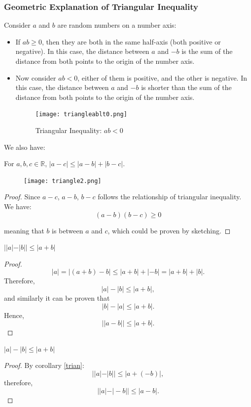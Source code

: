 \documentclass[
	12pt, %
	fleqn, %
	a4paper, %
]{LegrandOrangeBook}
\begin{document}
\subsubsection*{Geometric Explanation of Triangular Inequality}
    Consider $a$ and $b$ are random numbers on a number axis:
    \begin{itemize}
        \item If $ab \geq 0$, then they are both in the same half-axis (both positive or negative). In this case, the distance between $a$ and $-b$
        is the sum of the distance from both points to the origin of the number axis.
        \item  Now consider $ab < 0$, either of them is positive, and the other is negative. In this case, the distance between $a$ and $-b$ is shorter than the sum of 
        the distance from both points to the origin of the number axis.
        \begin{figure}[H]
            \centering
            \texttt{[image: triangleablt0.png]}
            \caption{Triangular Inequality: $ab < 0$}
        \end{figure}
    \end{itemize}

We also have:
    \begin{theorem}
        For $a, b, c\in \mathbb{R}$, $|a-c|\leq |a-b| + |b-c|$.
    \end{theorem}
    \begin{figure}[H]
        \centering
        \texttt{[image: triangle2.png]}
    \end{figure}
    \begin{proof}
        Since $a-c$, $a-b$, $b-c$ follows the relationship of triangular inequality. We have:
        $$(a-b)(b-c) \geq 0$$
        
        meaning that $b$ is between $a$ and $c$, which could be proven by sketching.
    \end{proof}

    \begin{corollary} \label{trian}
        $||a| - |b|| \leq |a + b|$
    \end{corollary}
    \begin{proof}
        \[ |a| = |(a+b) - b| \leq |a+b| + |-b| = |a+b| + |b|. \]
Therefore,
\[ |a| - |b| \leq |a+b|, \]
and similarly it can be proven that
\[ |b| - |a| \leq |a+b|. \]
Hence,
\[ ||a - b|| \leq |a+b|. \]
    \end{proof}

    \begin{corollary}
        $|a| - |b| \leq |a + b|$
        
    \end{corollary}
    \begin{proof}
        By corollary \autoref{trian}:
        \[ ||a| - |b|| \leq |a + (-b)|, \]
therefore,
\[ ||a| - |-b|| \leq |a - b|. \]
    \end{proof}
\end{document}
